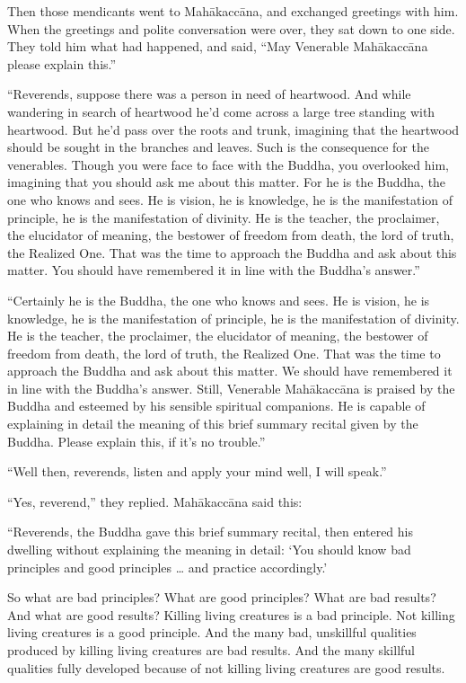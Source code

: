 \documentclass[12pt,openany]{book}%
\begin{document}
Then those mendicants went to \textsanskrit{Mahākaccāna}, and exchanged greetings with him. When the greetings and polite conversation were over, they sat down to one side. They told him what had happened, and said, “May Venerable \textsanskrit{Mahākaccāna} please explain this.” 

“Reverends, suppose there was a person in need of heartwood. And while wandering in search of heartwood he’d come across a large tree standing with heartwood. But he’d pass over the roots and trunk, imagining that the heartwood should be sought in the branches and leaves. Such is the consequence for the venerables. Though you were face to face with the Buddha, you overlooked him, imagining that you should ask me about this matter. For he is the Buddha, the one who knows and sees. He is vision, he is knowledge, he is the manifestation of principle, he is the manifestation of divinity. He is the teacher, the proclaimer, the elucidator of meaning, the bestower of freedom from death, the lord of truth, the Realized One. That was the time to approach the Buddha and ask about this matter. You should have remembered it in line with the Buddha’s answer.” 

“Certainly he is the Buddha, the one who knows and sees. He is vision, he is knowledge, he is the manifestation of principle, he is the manifestation of divinity. He is the teacher, the proclaimer, the elucidator of meaning, the bestower of freedom from death, the lord of truth, the Realized One. That was the time to approach the Buddha and ask about this matter. We should have remembered it in line with the Buddha’s answer. Still, Venerable \textsanskrit{Mahākaccāna} is praised by the Buddha and esteemed by his sensible spiritual companions. He is capable of explaining in detail the meaning of this brief summary recital given by the Buddha. Please explain this, if it’s no trouble.” 

“Well then, reverends, listen and apply your mind well, I will speak.” 

“Yes, reverend,” they replied. \textsanskrit{Mahākaccāna} said this: 

“Reverends, the Buddha gave this brief summary recital, then entered his dwelling without explaining the meaning in detail: ‘You should know bad principles and good principles … and practice accordingly.’ 

So what are bad principles? What are good principles? What are bad results? And what are good results? Killing living creatures is a bad principle. Not killing living creatures is a good principle. And the many bad, unskillful qualities produced by killing living creatures are bad results. And the many skillful qualities fully developed because of not killing living creatures are good results. 
\end{document}
